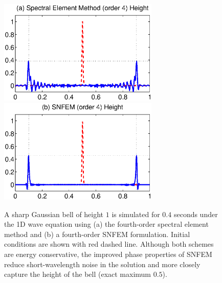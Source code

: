 \documentclass[11pt]{article}
\begin{document}
\begin{figure}
\begin{center}
\includegraphics[width=3in]{SimulatedBell_SE}
\includegraphics[width=3in]{SimulatedBell_SNFEM}
\end{center}
\caption{A sharp Gaussian bell of height $1$ is simulated for $0.4$ seconds under the 1D wave equation using (a) the fourth-order spectral element method and (b) a fourth-order SNFEM formulation.  Initial conditions are shown with red dashed line.  Although both schemes are energy conservative, the improved phase properties of SNFEM reduce short-wavelength noise in the solution and more closely capture the height of the bell (exact maximum $0.5$).}  \label{fig:SimulatedBell}
\end{figure}





\end{document}
